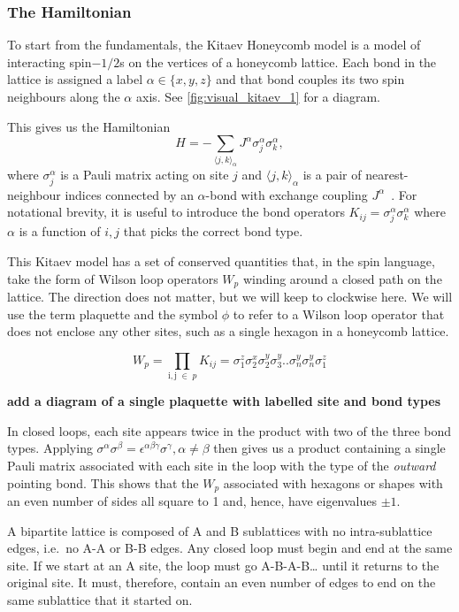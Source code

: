 \hypertarget{the-hamiltonian}{%
\subsubsection{The Hamiltonian}\label{the-hamiltonian}}

To start from the fundamentals, the Kitaev Honeycomb model is a model of interacting spin\(-1/2\)s on the vertices of a honeycomb lattice. Each bond in the lattice is assigned a label \(\alpha \in \{ x, y, z\}\) and that bond couples its two spin neighbours along the \(\alpha\) axis. See \cref{fig:visual_kitaev_1} for a diagram.

This gives us the Hamiltonian \[H =  - \sum_{\langle j,k\rangle_\alpha} J^{\alpha}\sigma_j^{\alpha}\sigma_k^{\alpha},\] where \(\sigma^\alpha_j\) is a Pauli matrix acting on site \(j\) and \(\langle j,k\rangle_\alpha\) is a pair of nearest-neighbour indices connected by an \(\alpha\)-bond with exchange coupling \(J^\alpha\)~\autocite{kitaevAnyonsExactlySolved2006}. For notational brevity, it is useful to introduce the bond operators \(K_{ij} = \sigma_j^{\alpha}\sigma_k^{\alpha}\) where \(\alpha\) is a function of \(i,j\) that picks the correct bond type.

This Kitaev model has a set of conserved quantities that, in the spin language, take the form of Wilson loop operators \(W_p\) winding around a closed path on the lattice. The direction does not matter, but we will keep to clockwise here. We will use the term plaquette and the symbol \(\phi\) to refer to a Wilson loop operator that does not enclose any other sites, such as a single hexagon in a honeycomb lattice.

\[W_p = \prod_{\mathrm{i,j}\; \in\; p} K_{ij} = \sigma_1^z \sigma_2^x \sigma_2^y \sigma_3^y .. \sigma_n^y \sigma_n^y \sigma_1^z\]

\textbf{add a diagram of a single plaquette with labelled site and bond types}

In closed loops, each site appears twice in the product with two of the three bond types. Applying \(\sigma^\alpha \sigma^\beta = \epsilon^{\alpha \beta \gamma} \sigma^\gamma, \alpha \neq \beta\) then gives us a product containing a single Pauli matrix associated with each site in the loop with the type of the \emph{outward} pointing bond. This shows that the \(W_p\) associated with hexagons or shapes with an even number of sides all square to 1 and, hence, have eigenvalues \(\pm 1\).

A bipartite lattice is composed of A and B sublattices with no intra-sublattice edges, i.e.~no A-A or B-B edges. Any closed loop must begin and end at the same site. If we start at an A site, the loop must go A-B-A-B\ldots{} until it returns to the original site. It must, therefore, contain an even number of edges to end on the same sublattice that it started on.

